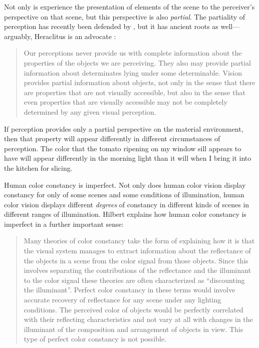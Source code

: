 \documentclass[12pt]{article}
\begin{document}
Not only is experience the presentation of elements of the scene to the perceiver's perspective on that scene, but this perspective is also \emph{partial}. The partiality of perception has recently been defended by \citet{Hilbert:1987jq}, but it has ancient roots as well---arguably, Heraclitus is an advocate \citep[see][]{Burnyeat:1979mv,Kalderon:2006tg}:
	\begin{quote}
		Our perceptions never provide us with complete information about the properties of the objects we are perceiving. They also may provide partial information about determinates lying under some determinable. Vision provides partial information about objects, not only in the sense that there are properties that are not visually accessible, but also in the sense that even properties that are visually accessible may not be completely determined by any given visual perception.
	\end{quote}
If perception provides only a partial perspective on the material environment, then that property will appear differently in different circumstances of perception. The color that the tomato ripening on my window sill appears to have will appear differently in the morning light than it will when I bring it into the kitchen for slicing.

Human color constancy is imperfect. Not only does human color vision display constancy for only of some scenes and some conditions of illumination, human color vision displays different \emph{degrees} of constancy in different kinds of scenes in different ranges of illumination. Hilbert explains how human color constancy is imperfect in a further important sense:
	\begin{quote}
		Many theories of color constancy take the form of explaining how it is that the visual system manages to extract information about the reflectance of the objects in a scene from the color signal from those objects. Since this involves separating the contributions of the reflectance and the illuminant to the color signal these theories are often characterized as ``discounting the illuminant''. Perfect color constancy in these terms would involve accurate recovery of reflectance for any scene under any lighting conditions. The perceived color of objects would be perfectly correlated with their reflecting characteristics and not vary at all with changes in the illuminant of the composition and arrangement of objects in view. This type of perfect color constancy is not possible. \citep[143]{Hilbert:2007qy}
	\end{quote}
\end{document}
